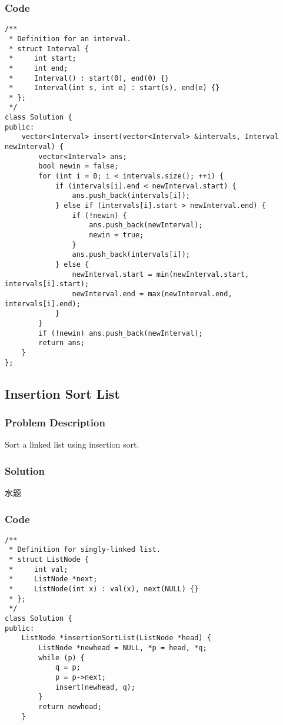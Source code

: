 \documentclass[courier]{article}
\begin{document}
\begin{CJK*}{UTF8}{gkai}
\subsubsection*{Code}
\begin{lstlisting}
/**
 * Definition for an interval.
 * struct Interval {
 *     int start;
 *     int end;
 *     Interval() : start(0), end(0) {}
 *     Interval(int s, int e) : start(s), end(e) {}
 * };
 */
class Solution {
public:
    vector<Interval> insert(vector<Interval> &intervals, Interval newInterval) {
        vector<Interval> ans;
        bool newin = false;
        for (int i = 0; i < intervals.size(); ++i) {
            if (intervals[i].end < newInterval.start) {
                ans.push_back(intervals[i]);
            } else if (intervals[i].start > newInterval.end) {
                if (!newin) {
                    ans.push_back(newInterval);
                    newin = true;
                }
                ans.push_back(intervals[i]);
            } else {
                newInterval.start = min(newInterval.start, intervals[i].start);
                newInterval.end = max(newInterval.end, intervals[i].end);
            }
        }
        if (!newin) ans.push_back(newInterval);
        return ans;
    }
}; 
\end{lstlisting}


\subsection{ Insertion Sort List }

\subsubsection*{Problem Description}
Sort a linked list using insertion sort.



\subsubsection*{Solution}
水题

\subsubsection*{Code}
\begin{lstlisting}
/**
 * Definition for singly-linked list.
 * struct ListNode {
 *     int val;
 *     ListNode *next;
 *     ListNode(int x) : val(x), next(NULL) {}
 * };
 */
class Solution {
public:
    ListNode *insertionSortList(ListNode *head) {
        ListNode *newhead = NULL, *p = head, *q;
        while (p) {
            q = p;
            p = p->next;
            insert(newhead, q);
        }
        return newhead;
    }
    

\end{lstlisting}
\end{CJK*}
\end{document}
